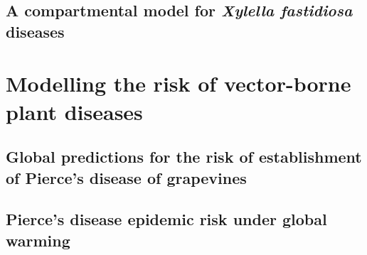 \documentclass[
	10pt, %
	fleqn, %
	a4paper, %
]{LegrandOrangeBook}
\begin{document}
\chapter{A compartmental model for \textit{Xylella fastidiosa} diseases}


{
	\hypersetup{hidelinks}
	\part{Modelling the risk of vector-borne plant diseases}
}

\chapterspaceabove{6.75cm}
\chapterspacebelow{7.25cm}

\chapter{Global predictions for the risk of establishment of Pierce’s disease
  of grapevines}\label{ch:commsbio}


\chapterspaceabove{6.75cm}
\chapterspacebelow{7.25cm}

\chapter{Pierce's disease epidemic risk under global warming}


\chapterspaceabove{6.75cm}
\chapterspacebelow{7.25cm}
\end{document}
